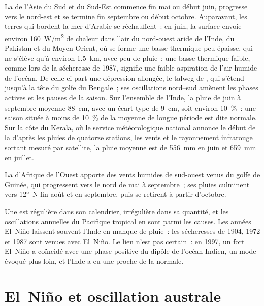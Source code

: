 La  de l'Asie du Sud et du Sud-Est commence fin mai ou début juin, progresse vers le nord-est
et se termine fin septembre ou début octobre. Auparavant, les terres qui bordent la mer d'Arabie se réchauffent~:
en juin, la surface envoie environ \qty{160}{W/m^2} de chaleur dans l'air du nord-ouest aride de l'Inde,
du Pakistan et du Moyen-Orient, où se forme une basse thermique peu épaisse, qui ne s'élève qu'à environ
\qty{1.5}{km}, avec peu de pluie~; une basse thermique faible, comme lors de la sécheresse de 1987,
signifie une faible aspiration de l'air humide de l'océan. De celle-ci part une dépression allongée,
le talweg de , qui s'étend jusqu'à la tête du golfe du Bengale~; ses oscillations nord--sud
amènent les phases actives et les pauses de la saison. Sur l'ensemble de l'Inde, la pluie de juin à septembre
moyenne \qty{88}{cm}, avec un écart type de \qty{9}{cm}, soit environ \qty{10}{\percent}~: une saison située à moins de
\qty{10}{\percent} de la moyenne de longue période est dite normale. Sur la côte du Kerala, où le service
météorologique national annonce le début de la  d'après les pluies de quatorze stations, les vents et le
rayonnement infrarouge sortant mesuré par satellite, la pluie moyenne est de \qty{556}{mm} en juin et
\qty{659}{mm} en juillet.

La  d'Afrique de l'Ouest apporte des vents humides de sud-ouest venus du golfe de Guinée, qui progressent
vers le nord de mai à septembre~; ses pluies culminent vers \ang{12}~N fin août et en septembre,
puis se retirent à partir d'octobre.

Une  est régulière dans son calendrier, irrégulière dans sa quantité, et les oscillations annuelles du
Pacifique tropical en sont parmi les causes. Les années El~Niño laissent souvent l'Inde en manque de pluie~: les
sécheresses de 1904, 1972 et 1987 sont venues avec El~Niño. Le lien n'est pas certain~: en 1997, un fort El~Niño
a coïncidé avec une phase positive du dipôle de l'océan Indien, un mode évoqué plus loin, et l'Inde a eu une
 proche de la normale.

\section{El~Niño et oscillation australe}\label{sec:b2:climate-variability:enso}

